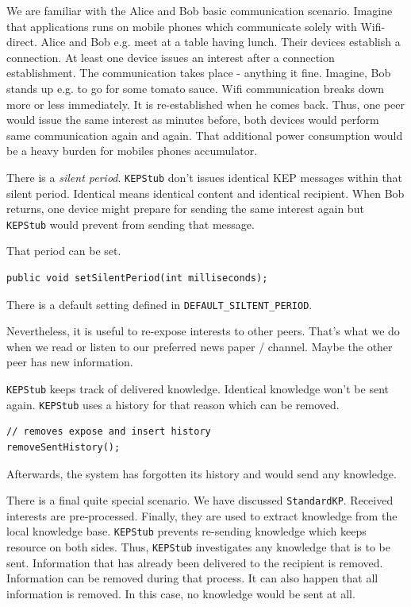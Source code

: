 We are familiar with the Alice and Bob basic communication scenario. Imagine that applications runs on mobile phones which communicate solely with Wifi-direct. Alice and Bob e.g. meet at a table having lunch. Their devices establish a connection. At least one device issues an interest after a connection establishment. The communication takes place - anything it fine.
Imagine, Bob stands up e.g. to go for some tomato sauce. Wifi communication breaks down more or less immediately. It is re-established when he comes back.
Thus, one peer would issue the same interest as minutes before, both devices would perform same communication again and again. That additional power consumption would be a heavy burden for mobiles phones accumulator.

There is a {\it silent period}. {\tt KEPStub} don't issues identical KEP messages within that silent period. Identical means identical content and identical recipient. When Bob returns, one device might prepare for sending the same interest again but {\tt KEPStub} would prevent from sending that message.

That period can be set.
\begin{verbatim}
public void setSilentPeriod(int milliseconds);
\end{verbatim}

There is a default setting defined in {\tt DEFAULT\_SILTENT\_PERIOD}.

Nevertheless, it is useful to re-expose interests to other peers. That's what we do when we read or listen to our preferred news paper / channel. Maybe the other peer has new information.

{\tt KEPStub} keeps track of delivered knowledge. Identical knowledge won't be sent again. {\tt KEPStub} uses a history for that reason which can be removed.

\begin{verbatim}
// removes expose and insert history
removeSentHistory();
\end{verbatim}
Afterwards, the system has forgotten its history and would send any knowledge.

There is a final quite special scenario. 
We have discussed {\tt StandardKP}. Received interests are pre-processed. Finally, they are used to extract knowledge from the local knowledge base. {\tt KEPStub} prevents re-sending knowledge which keeps resource on both sides.
Thus, {\tt KEPStub} investigates any knowledge that is to be sent. Information that has already been delivered to the recipient is removed. Information can be removed during that process. It can also happen that all information is removed. In this case, no knowledge would be sent at all.

